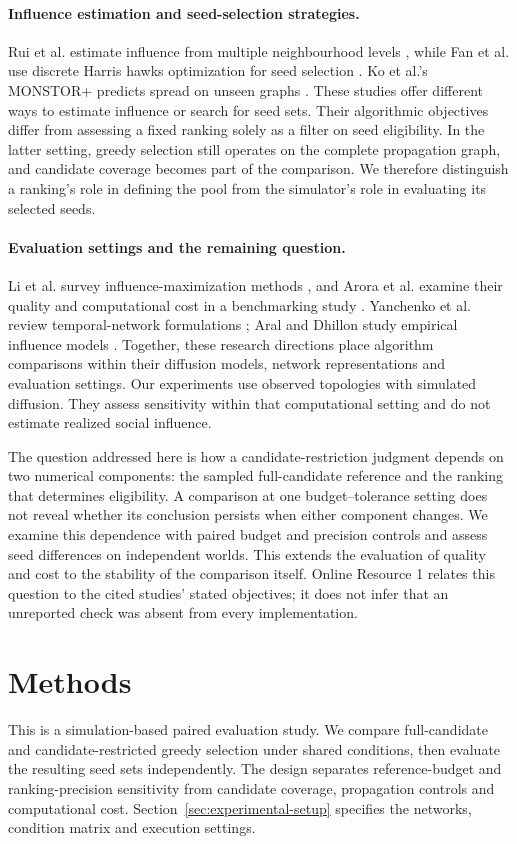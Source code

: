\documentclass[smallextended]{svjour3}
\begin{document}
\paragraph{Influence estimation and seed-selection strategies.} Rui et al. estimate influence from multiple neighbourhood levels \cite{ref12}, while Fan et al. use discrete Harris hawks optimization for seed selection \cite{ref13}. Ko et al.'s MONSTOR+ predicts spread on unseen graphs \cite{ref19}. These studies offer different ways to estimate influence or search for seed sets. Their algorithmic objectives differ from assessing a fixed ranking solely as a filter on seed eligibility. In the latter setting, greedy selection still operates on the complete propagation graph, and candidate coverage becomes part of the comparison. We therefore distinguish a ranking's role in defining the pool from the simulator's role in evaluating its selected seeds.

\paragraph{Evaluation settings and the remaining question.} Li et al. survey influence-maximization methods \cite{ref9}, and Arora et al. examine their quality and computational cost in a benchmarking study \cite{ref16}. Yanchenko et al. review temporal-network formulations \cite{ref11}; Aral and Dhillon study empirical influence models \cite{ref15}. Together, these research directions place algorithm comparisons within their diffusion models, network representations and evaluation settings. Our experiments use observed topologies with simulated diffusion. They assess sensitivity within that computational setting and do not estimate realized social influence.

The question addressed here is how a candidate-restriction judgment depends on two numerical components: the sampled full-candidate reference and the ranking that determines eligibility. A comparison at one budget--tolerance setting does not reveal whether its conclusion persists when either component changes. We examine this dependence with paired budget and precision controls and assess seed differences on independent worlds. This extends the evaluation of quality and cost to the stability of the comparison itself. Online Resource 1 relates this question to the cited studies' stated objectives; it does not infer that an unreported check was absent from every implementation.

\section{Methods}
This is a simulation-based paired evaluation study. We compare full-candidate and candidate-restricted greedy selection under shared conditions, then evaluate the resulting seed sets independently. The design separates reference-budget and ranking-precision sensitivity from candidate coverage, propagation controls and computational cost. Section~\ref{sec:experimental-setup} specifies the networks, condition matrix and execution settings.
\end{document}
